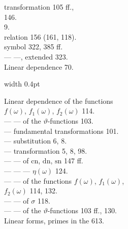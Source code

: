 \begin{minipage}[t]{0.48\textwidth}
\noindent {} transformation 105 ff.,\\
146.\\
 9.\\
 relation 156 (161, 118).\\
 symbol 322, 385 ff.\\
--- ---, extended 323.\\
Linear dependence 70.
\end{minipage}%
\hfill\vrule width 0.4pt\hfill
\begin{minipage}[t]{0.48\textwidth}
\noindent Linear dependence of the functions\\
$f(\omega)$, $f_1(\omega)$, $f_2(\omega)$ 114.\\
--- --- of the $\vartheta$-functions 103.\\
--- fundamental transformations 101.\\
--- substitution 6, 8.\\
--- transformation 5, 8, 98.\\
--- --- of $\mathrm{cn}$, $\mathrm{dn}$, $\mathrm{sn}$ 147 ff.\\
--- --- --- $\eta(\omega)$ 124. \\ %
--- --- of the functions $f(\omega)$, $f_1(\omega)$,\\
$f_2(\omega)$ 114, 132.\\
--- --- of $\sigma$ 118.\\
--- --- of the $\vartheta$-functions 103 ff., 130.\\
Linear forms, primes in the 613.


\end{minipage}
